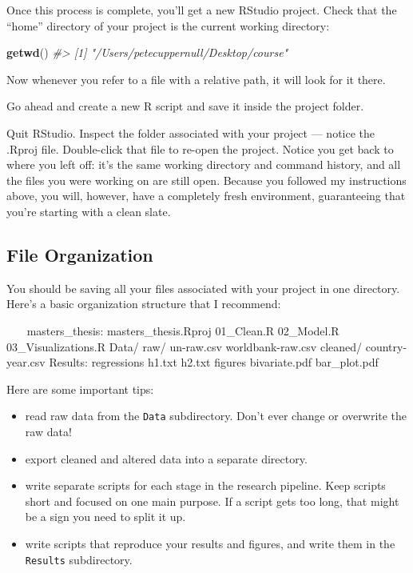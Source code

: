 \documentclass[]{book}
\newenvironment{Shaded}{\begin{snugshade}}{\end{snugshade}}
\newcommand{\KeywordTok}[1]{\textcolor[rgb]{0.13,0.29,0.53}{\textbf{#1}}}
\newcommand{\BaseNTok}[1]{\textcolor[rgb]{0.00,0.00,0.81}{#1}}
\newcommand{\CommentTok}[1]{\textcolor[rgb]{0.56,0.35,0.01}{\textit{#1}}}
\newcommand{\NormalTok}[1]{#1}
\providecommand{\tightlist}{%
  \setlength{\itemsep}{0pt}\setlength{\parskip}{0pt}}
\begin{document}
Once this process is complete, you'll get a new RStudio project. Check
that the ``home'' directory of your project is the current working
directory:

\begin{Shaded}
\begin{Highlighting}[]
\KeywordTok{getwd}\NormalTok{()}
\CommentTok{#> [1] "/Users/petecuppernull/Desktop/course"}
\end{Highlighting}
\end{Shaded}

Now whenever you refer to a file with a relative path, it will look for
it there.

Go ahead and create a new R script and save it inside the project
folder.

Quit RStudio. Inspect the folder associated with your project --- notice
the .Rproj file. Double-click that file to re-open the project. Notice
you get back to where you left off: it's the same working directory and
command history, and all the files you were working on are still open.
Because you followed my instructions above, you will, however, have a
completely fresh environment, guaranteeing that you're starting with a
clean slate.

\subsection{File Organization}\label{file-organization}

You should be saving all your files associated with your project in one
directory. Here's a basic organization structure that I recommend:

\begin{Shaded}
\begin{Highlighting}[]
\NormalTok{~~~}
\NormalTok{masters_thesis:}
\NormalTok{  masters_thesis.Rproj}
\NormalTok{  01_Clean.R}
\NormalTok{  02_Model.R}
\NormalTok{  03_Visualizations.R}
\NormalTok{  Data/}
\BaseNTok{    raw/}
\BaseNTok{      un-raw.csv}
\BaseNTok{      worldbank-raw.csv}
\BaseNTok{    cleaned/}
\BaseNTok{      country-year.csv}
\NormalTok{  Results:}
\BaseNTok{    regressions}
\BaseNTok{      h1.txt}
\BaseNTok{      h2.txt}
\BaseNTok{    figures}
\BaseNTok{      bivariate.pdf}
\BaseNTok{      bar_plot.pdf}
\NormalTok{~~~}
\end{Highlighting}
\end{Shaded}

Here are some important tips:

\begin{itemize}
\tightlist
\item
  read raw data from the \texttt{Data} subdirectory. Don't ever change
  or overwrite the raw data!
\item
  export cleaned and altered data into a separate directory.
\item
  write separate scripts for each stage in the research pipeline. Keep
  scripts short and focused on one main purpose. If a script gets too
  long, that might be a sign you need to split it up.
\item
  write scripts that reproduce your results and figures, and write them
  in the \texttt{Results} subdirectory.
\end{itemize}
\end{document}
